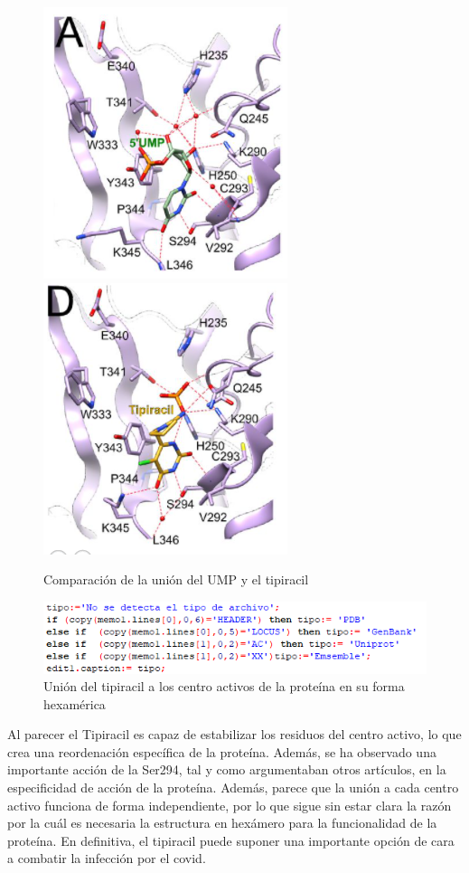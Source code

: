 \documentclass[12pt]{article}
\begin{document}
\begin{figure}[H]
\centering
\includegraphics[scale=0.9]{Screenshot_23}
\includegraphics[scale=0.9]{Screenshot_24}
\caption{Comparación de la unión del UMP y el tipiracil}  
\end{figure}

\begin{figure}[H]
\centering
\includegraphics[scale=0.9]{Screenshot_25}
\caption{Unión del tipiracil a los centro activos de la proteína en su forma hexamérica}  
\end{figure}

Al parecer el Tipiracil es capaz de estabilizar los residuos del centro activo, lo que crea una reordenación específica de la proteína. Además, se ha observado una importante acción de la Ser294, tal y como argumentaban otros artículos, en la especificidad de acción de la proteína. Además, parece que la unión a cada centro activo funciona de forma independiente, por lo que sigue sin estar clara la razón por la cuál es necesaria la estructura en hexámero para la funcionalidad de la proteína. En definitiva, el tipiracil puede suponer una importante opción de cara a combatir la infección por el covid.
\end{document}
